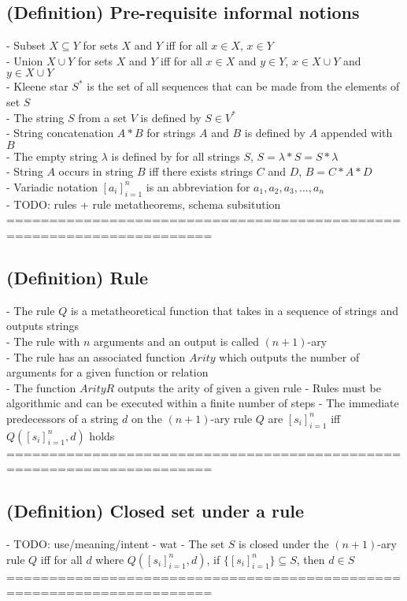\documentclass{article}
\begin{document}
\subsection{(Definition) Pre-requisite informal notions}
	- Subset $X \subseteq Y$ for sets $X$ and $Y$ iff for all $x \in X$, $x \in Y$ \\
	- Union $X \cup Y$ for sets $X$ and $Y$ iff for all $x \in X$ and $y \in Y$, $x \in X \cup Y$ and $y \in X \cup Y$ \\
	- Kleene star $S^*$ is the set of all sequences that can be made from the elements of set $S$ \\
	- The string $S$ from a set $V$ is defined by $S \in V^*$ \\
	- String concatenation $A * B$ for strings $A$ and $B$ is defined by $A$ appended with $B$ \\
	- The empty string $\lambda$ is defined by for all strings $S$, $S = \lambda * S = S * \lambda$ \\
	- String $A$ occurs in string $B$ iff there exists strings $C$ and $D$, $B = C * A * D$ \\
	- Variadic notation $[a_i]_{i=1}^n$ is an abbreviation for $a_1, a_2, a_3, ..., a_n$ \\
	- TODO: rules + rule metatheorems, schema subsitution
	======================================================================
\subsection{(Definition) Rule}
	- The rule $Q$ is a metatheoretical function that takes in a sequence of strings and outputs strings \\
	- The rule with $n$ arguments and an output is called $(n+1)$-ary \\
	- The rule has an associated function $Arity$ which outputs the number of arguments for a given function or relation \\
	- The function $ArityR$ outputs the arity of given a given rule
	- Rules must be algorithmic and can be executed within a finite number of steps
	- The immediate predecessors of a string $d$ on the $(n+1)$-ary rule $Q$ are $[s_i]_{i=1}^n$ iff $Q([s_i]_{i=1}^n, d)$ holds
	======================================================================
\subsection{(Definition) Closed set under a rule}
	- TODO: use/meaning/intent - wat
	- The set $S$ is closed under the $(n+1)$-ary rule $Q$ iff for all $d$ where $Q([s_i]_{i=1}^n, d)$, if $\{[s_i]_{i=1}^n\} \subseteq S$, then $d \in S$ \\
	======================================================================
\end{document}
